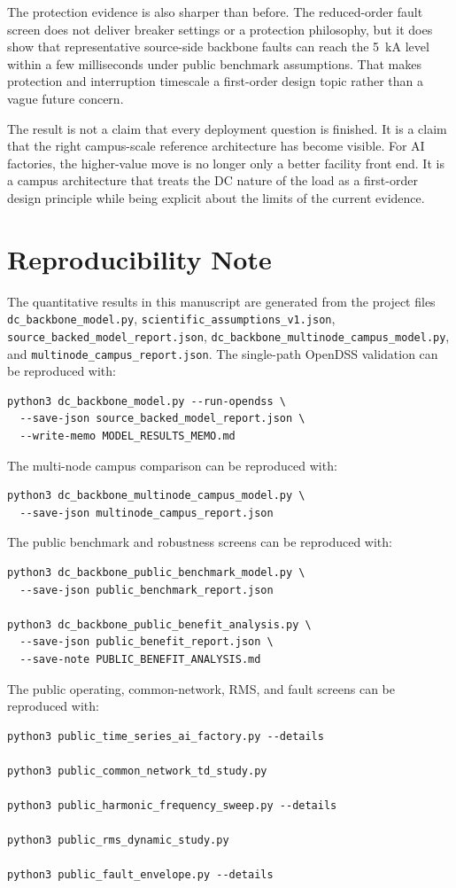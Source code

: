 \documentclass[11pt]{article}
\begin{document}
The protection evidence is also sharper than before. The reduced-order fault screen does not deliver breaker settings or a protection philosophy, but it does show that representative source-side backbone faults can reach the 5~kA level within a few milliseconds under public benchmark assumptions. That makes protection and interruption timescale a first-order design topic rather than a vague future concern.

The result is not a claim that every deployment question is finished. It is a claim that the right campus-scale reference architecture has become visible. For AI factories, the higher-value move is no longer only a better facility front end. It is a campus architecture that treats the DC nature of the load as a first-order design principle while being explicit about the limits of the current evidence.

\section*{Reproducibility Note}
The quantitative results in this manuscript are generated from the project files \texttt{dc\_backbone\_model.py}, \texttt{scientific\_assumptions\_v1.json}, \texttt{source\_backed\_model\_report.json}, \texttt{dc\_backbone\_multinode\_campus\_model.py}, and \texttt{multinode\_campus\_report.json}. The single-path OpenDSS validation can be reproduced with:
\begin{verbatim}
python3 dc_backbone_model.py --run-opendss \
  --save-json source_backed_model_report.json \
  --write-memo MODEL_RESULTS_MEMO.md
\end{verbatim}
The multi-node campus comparison can be reproduced with:
\begin{verbatim}
python3 dc_backbone_multinode_campus_model.py \
  --save-json multinode_campus_report.json
\end{verbatim}
The public benchmark and robustness screens can be reproduced with:
\begin{verbatim}
python3 dc_backbone_public_benchmark_model.py \
  --save-json public_benchmark_report.json

python3 dc_backbone_public_benefit_analysis.py \
  --save-json public_benefit_report.json \
  --save-note PUBLIC_BENEFIT_ANALYSIS.md
\end{verbatim}
The public operating, common-network, RMS, and fault screens can be reproduced with:
\begin{verbatim}
python3 public_time_series_ai_factory.py --details

python3 public_common_network_td_study.py

python3 public_harmonic_frequency_sweep.py --details

python3 public_rms_dynamic_study.py

python3 public_fault_envelope.py --details
\end{verbatim}



\end{document}
